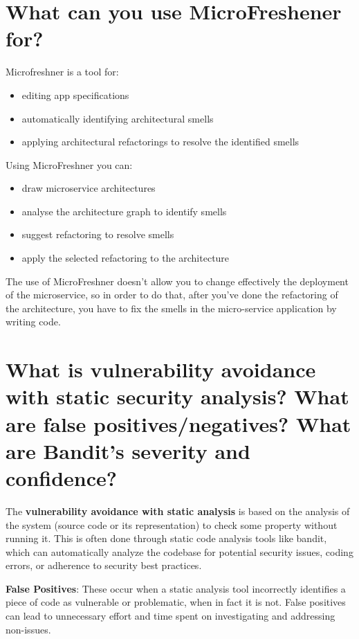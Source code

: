 \section{What can you use MicroFreshener for?}
Microfreshner is a tool for:
\begin{itemize}
   \item editing app specifications
   \item automatically identifying architectural smells
   \item applying architectural refactorings to resolve the identified smells
\end{itemize}
Using MicroFreshner you can:
\begin{itemize}
   \item draw microservice architectures
   \item analyse the architecture graph to identify smells
   \item suggest refactoring to resolve smells
   \item apply the selected refactoring to the architecture
\end{itemize}
The use of MicroFreshner doesn't allow you to change effectively the deployment of the microservice, so in order to do that, after you've done the refactoring of the architecture, you have to fix the smells in the micro-service application by writing code. \nl
{}
\section{What is vulnerability avoidance with static security analysis? What are false positives/negatives? What are Bandit’s severity and confidence?}

The \textbf{vulnerability avoidance with static analysis} is based on the analysis of the system (source code or its representation) to check some property without running it. This is often done through static code analysis tools like bandit, which can automatically analyze the codebase for potential security issues, coding errors, or adherence to security best practices.

\textbf{False Positives}: These occur when a static analysis tool incorrectly identifies a piece of code as vulnerable or problematic, when in fact it is not. False positives can lead to unnecessary effort and time spent on investigating and addressing non-issues.

